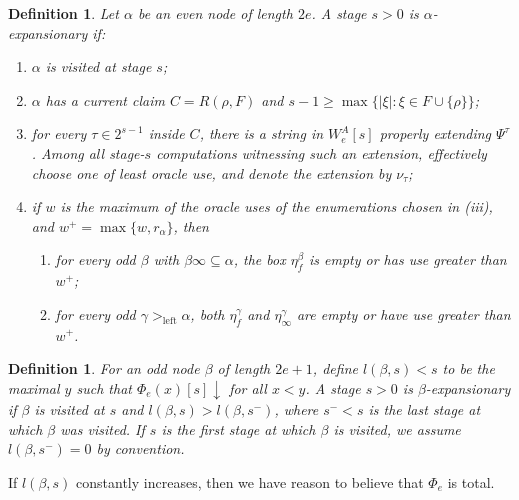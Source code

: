 \documentclass[11pt]{amsart}
\newtheorem{definition}[theorem]{Definition}
\begin{document}
\begin{definition}\label{d6}
    Let $\alpha$ be an even node of length $2e$.  A stage $s>0$
is \emph{$\alpha$-expansionary} if:

\begin{enumerate}[label=(\roman*)]
\item $\alpha$ is visited at stage $s$;
\item $\alpha$ has a current claim $C=R(\rho,F)$ and
      $s-1\geq \max\{ |\xi|:\xi\in F\cup\{\rho\}\}$;
\item for every $\tau\in 2^{s-1}$ inside $C$, there is a string in
      $W_e^A[s]$ properly extending $\Psi^\tau$.  Among all stage-$s$
      computations witnessing such an extension, effectively choose one of least oracle
      use, and denote the extension
      by $\nu_\tau$;
\item if $w$ is the maximum of the oracle uses of the enumerations chosen in
      (iii), and $ w^+=\max\{w,r_\alpha\}$,
      then 
      \begin{enumerate}[label=(\alph*)]
      \item for every odd $\beta$ with $\beta\infty\subseteq\alpha$, the box
            $\eta_f^\beta$ is empty or has use greater than $w^+$;
      \item for every odd $\gamma>_{\mathrm{left}}\alpha$, both
            $\eta_f^\gamma$ and $\eta_\infty^\gamma$ are empty or have use
            greater than $w^+$.
      \end{enumerate}
\end{enumerate}
\end{definition}

\begin{definition}
    For an odd node $\beta$ of length $2e+1$, define $l(\beta,s)<s$ to be the maximal $y$ such that $\Phi_e(x)[s]\downarrow$ for all $x<y$.
A stage $s>0$ is \emph{$\beta$-expansionary} if $\beta$ is visited at $s$ and
$l(\beta,s)>l(\beta,s^-)$, where $s^-<s$ is the last stage at which
$\beta$ was visited. If $s$ is the first stage at which $\beta$ is visited, we assume $l(\beta,s^-)=0$ by convention.
\end{definition}

If $l (\beta, s)$ constantly increases, then we have reason
to believe that $\Phi_e$ is total. 
\end{document}
